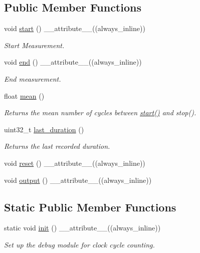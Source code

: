 \subsection*{Public Member Functions}
\begin{DoxyCompactItemize}
\item 
void \hyperlink{classPerfCounter_a5fdd73c1d604decd6dc745aada8092d1}{start} () \+\_\+\+\_\+attribute\+\_\+\+\_\+((always\+\_\+inline))
\begin{DoxyCompactList}\small\item\em Start Measurement. \end{DoxyCompactList}\item 
void \hyperlink{classPerfCounter_ab5d9f05bb15139451eaa857989ed8bd8}{end} () \+\_\+\+\_\+attribute\+\_\+\+\_\+((always\+\_\+inline))
\begin{DoxyCompactList}\small\item\em End measurement. \end{DoxyCompactList}\item 
float \hyperlink{classPerfCounter_a5992367178f424e486a7709659e276a6}{mean} ()
\begin{DoxyCompactList}\small\item\em Returns the mean number of cycles between {\ttfamily \hyperlink{classPerfCounter_a5fdd73c1d604decd6dc745aada8092d1}{start()}} and {\ttfamily stop()}. \end{DoxyCompactList}\item 
uint32\+\_\+t \hyperlink{classPerfCounter_a5239f46d98a619e0145f09320052bfc8}{last\+\_\+duration} ()
\begin{DoxyCompactList}\small\item\em Returns the last recorded duration. \end{DoxyCompactList}\item 
void \hyperlink{classPerfCounter_a60f7428eabd82437280b662d6829e184}{reset} () \+\_\+\+\_\+attribute\+\_\+\+\_\+((always\+\_\+inline))
\item 
void \hyperlink{classPerfCounter_a291ce8187d35e1f97a68339fe51931a4}{output} () \+\_\+\+\_\+attribute\+\_\+\+\_\+((always\+\_\+inline))
\end{DoxyCompactItemize}
\subsection*{Static Public Member Functions}
\begin{DoxyCompactItemize}
\item 
static void \hyperlink{classPerfCounter_ae1897d617e84a28c141d554810fcaee9}{init} () \+\_\+\+\_\+attribute\+\_\+\+\_\+((always\+\_\+inline))
\begin{DoxyCompactList}\small\item\em Set up the debug module for clock cycle counting. \end{DoxyCompactList}\end{DoxyCompactItemize}
